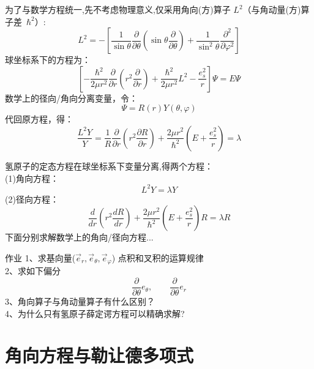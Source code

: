 	为了与数学方程统一,先不考虑物理意义,仅采用角向(方)算子 $L^2$（与角动量(方)算子差~$\hbar ^2$）:
	\begin{equation*}
		L^2 =  -\left[ \frac{1}{ \sin \theta  } \frac{\partial }{\partial \theta } (\sin \theta \frac{\partial }{\partial \theta } )
		+\frac{1}{ \sin^2 \theta  } \frac{\partial^2}{\partial\varphi ^2} \right]
	\end{equation*}	
	球坐标系下的方程为：
	\begin{equation*}
		\left[-\frac{\hbar^2}{2 \mu r^2}  \frac{\partial }{\partial r} (r^2\frac{\partial }{\partial r} ) +  \frac{\hbar ^2 }{2 \mu r^2} L^2  -\frac{e_s ^2}{r} \right] \Psi
		=E\Psi
	\end{equation*}	
	数学上的径向/角向分离变量，令： 
	\begin{equation*}
		\Psi=R (r) Y(\theta,\varphi)
	\end{equation*}	
	代回原方程，得：
	\begin{equation*}
		\frac{ L^2 Y}{Y}= \frac{1}{R}   \frac{\partial }{\partial r} (r^2\frac{\partial R }{\partial r} ) + \frac{2 \mu r^2} {\hbar^2}(E+ \frac{e_s ^2}{r} )=\lambda
	\end{equation*}	
		


	氢原子的定态方程在球坐标系下变量分离,得两个方程：	\\
	(1)角向方程：
	\begin{equation*}
		L^2 Y=\lambda Y
	\end{equation*}	
	(2)径向方程：
	\begin{equation*}
		\frac{d}{d r} (r^2\frac{d R }{d r} ) + \frac{2 \mu r^2} {\hbar^2}(E+ \frac{e_s ^2}{r} ) R =\lambda R
	\end{equation*}	
	下面分别求解数学上的角向/径向方程...
	


	{ 作业 }
	1、求基向量($\vec{e}_r, \vec{e}_\theta, \vec{e}_\varphi$) 点积和叉积的运算规律\\
	2、求如下偏分
	\begin{equation*}
	\frac{\partial }{\partial \theta}  e_\theta, \qquad \frac{\partial }{\partial \theta}  e_r 
	\end{equation*}	
    3、角向算子与角动量算子有什么区别？ \\
	4、为什么只有氢原子薛定谔方程可以精确求解?
	

\section{角向方程与勒让德多项式}

